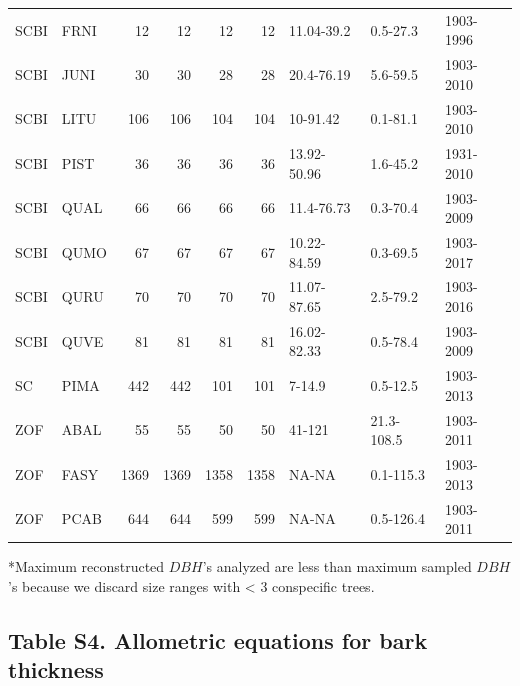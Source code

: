 \documentclass[
]{article}
\begin{document}
\begin{table}[!h]
{\begin{tabular}{llrrrrlll}
\addlinespace
SCBI & FRNI & 12 & 12 & 12 & 12 & 11.04-39.2 & 0.5-27.3 & 1903-1996\\
\addlinespace
SCBI & JUNI & 30 & 30 & 28 & 28 & 20.4-76.19 & 5.6-59.5 & 1903-2010\\
\addlinespace
SCBI & LITU & 106 & 106 & 104 & 104 & 10-91.42 & 0.1-81.1 & 1903-2010\\
\addlinespace
SCBI & PIST & 36 & 36 & 36 & 36 & 13.92-50.96 & 1.6-45.2 & 1931-2010\\
\addlinespace
SCBI & QUAL & 66 & 66 & 66 & 66 & 11.4-76.73 & 0.3-70.4 & 1903-2009\\
\addlinespace
SCBI & QUMO & 67 & 67 & 67 & 67 & 10.22-84.59 & 0.3-69.5 & 1903-2017\\
\addlinespace
SCBI & QURU & 70 & 70 & 70 & 70 & 11.07-87.65 & 2.5-79.2 & 1903-2016\\
\addlinespace
SCBI & QUVE & 81 & 81 & 81 & 81 & 16.02-82.33 & 0.5-78.4 & 1903-2009\\
\addlinespace
SC & PIMA & 442 & 442 & 101 & 101 & 7-14.9 & 0.5-12.5 & 1903-2013\\
\addlinespace
ZOF & ABAL & 55 & 55 & 50 & 50 & 41-121 & 21.3-108.5 & 1903-2011\\
\addlinespace
ZOF & FASY & 1369 & 1369 & 1358 & 1358 & NA-NA & 0.1-115.3 & 1903-2013\\
\addlinespace
ZOF & PCAB & 644 & 644 & 599 & 599 & NA-NA & 0.5-126.4 & 1903-2011\\
\bottomrule
\end{tabular}}
\end{table}

*Maximum reconstructed \(DBH\)'s analyzed are less than maximum sampled
\(DBH\)'s because we discard size ranges with \textless{} 3 conspecific
trees.

\newpage

\hypertarget{table-s4.-allometric-equations-for-bark-thickness}{%
\subsection{Table S4. Allometric equations for bark
thickness}\label{table-s4.-allometric-equations-for-bark-thickness}}
\end{document}
